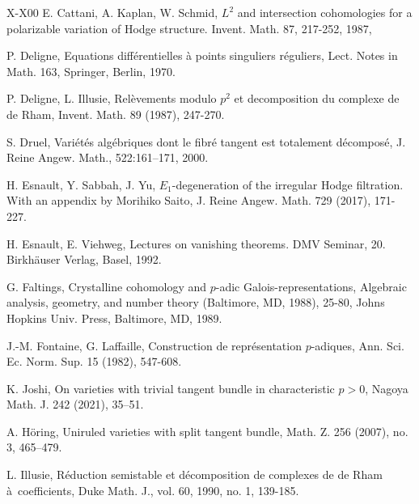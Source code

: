 \documentclass[12pt, a4paper]{article}
\begin{document}
\begin{thebibliography}{X-X00}
 	E. Cattani, A. Kaplan, W. Schmid, $L^2$ and intersection cohomologies for a polarizable variation of Hodge structure. Invent. Math. 87, 217-252, 1987,
	
	
	
	
	P. Deligne, Equations diff\'erentielles \`a points singuliers r\'eguliers, Lect. Notes in Math. 163, Springer, Berlin, 1970.  	

 	P. Deligne, L. Illusie, Rel\`{e}vements modulo $p^2$ et decomposition du complexe de de Rham, Invent. Math. 89 (1987), 247-270.

     S. Druel, Variétés algébriques dont le fibré tangent est totalement décomposé,
 J. Reine Angew. Math., 522:161–171, 2000.
    

	 H. Esnault, Y. Sabbah, J. Yu, $E_1$-degeneration of the irregular Hodge filtration. With an appendix by Morihiko Saito, J. Reine Angew. Math. 729 (2017), 171-227. 	
	
 	H. Esnault, E. Viehweg, Lectures on vanishing theorems. DMV Seminar, 20. Birkh\"{a}user Verlag, Basel, 1992.
 	
 	G. Faltings, Crystalline cohomology and $p$-adic Galois-representations, Algebraic analysis, geometry, and number theory (Baltimore, MD, 1988), 25-80, Johns Hopkins Univ. Press,
 	Baltimore, MD, 1989.

 	J.-M. Fontaine, G. Laffaille, Construction de repr\'{e}sentation
 	$p$-adiques, Ann. Sci. Ec. Norm. Sup. 15 (1982), 547-608.

     
K. Joshi, On varieties with trivial tangent bundle in characteristic $p>0$, Nagoya Math. J. 242 (2021), 35–51.
    
 	A. Höring, Uniruled varieties with split tangent bundle, Math. Z. 256 (2007), no. 3, 465–479.

 	L. Illusie, R\'eduction semistable et d\'ecomposition de complexes de de Rham
 	\`a\ coefficients, Duke Math. J., vol. 60, 1990, no. 1, 139-185.
 	

\end{thebibliography}
\end{document}
